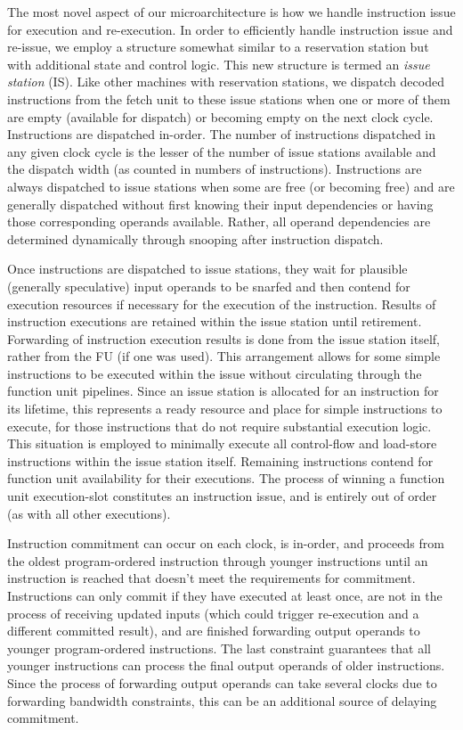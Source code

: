 \documentclass[10pt,twocolumn,dvips]{article}
\begin{document}
The most novel aspect of our microarchitecture is how we
handle instruction issue for execution and re-execution.
In order to efficiently handle instruction issue and re-issue,
we employ a structure somewhat similar to
a reservation station but with additional state and control
logic.  
This new structure is termed
an \textit{issue station} (IS).
Like other machines with reservation stations, we dispatch 
decoded instructions from the fetch unit to these issue stations
when one or more of them are empty (available for dispatch) or 
becoming empty on the next clock cycle.  
Instructions are dispatched in-order.
The number of instructions dispatched in any 
given clock cycle is
the lesser of the number of issue stations available and the
dispatch width (as counted in numbers of instructions).
Instructions are always dispatched to issue stations when
some are free (or becoming free) and are generally dispatched
without first knowing their input dependencies or having those
corresponding operands available.
Rather, all operand dependencies are determined dynamically through
snooping after instruction dispatch.

Once instructions are dispatched to issue stations,
they wait for plausible (generally speculative) input operands
to be snarfed and then
contend for execution resources if necessary for the execution
of the instruction.
Results of instruction executions are retained within
the issue station until retirement.  
Forwarding of instruction execution
results is done from the issue station itself, rather from the
FU (if one was used).
This arrangement allows for some simple instructions to be executed within
the issue without circulating through the function unit
pipelines.  
Since an issue station is allocated for an instruction for
its lifetime, this represents a ready resource and place for simple
instructions to execute, for those instructions that do 
not require substantial execution logic.  
This situation is employed to minimally execute all
control-flow and load-store instructions within the
issue station itself.
Remaining instructions contend for 
function unit availability for their executions.
The process of winning a function unit execution-slot constitutes
an instruction issue, and is entirely out of order (as with
all other executions).

Instruction commitment can occur on each clock, is in-order, and
proceeds from the oldest program-ordered
instruction through younger instructions until an instruction
is reached that doesn't meet the requirements for commitment.
Instructions can only commit if they have executed at least once,
are not in the process of receiving updated inputs (which could
trigger re-execution and a different committed result),
and are finished forwarding output operands 
to younger program-ordered instructions.  
The last constraint guarantees that all younger
instructions can process the final output operands of older
instructions.
Since the process of forwarding output operands can take several
clocks due to forwarding bandwidth constraints, this can be
an additional source of delaying commitment.
\end{document}
